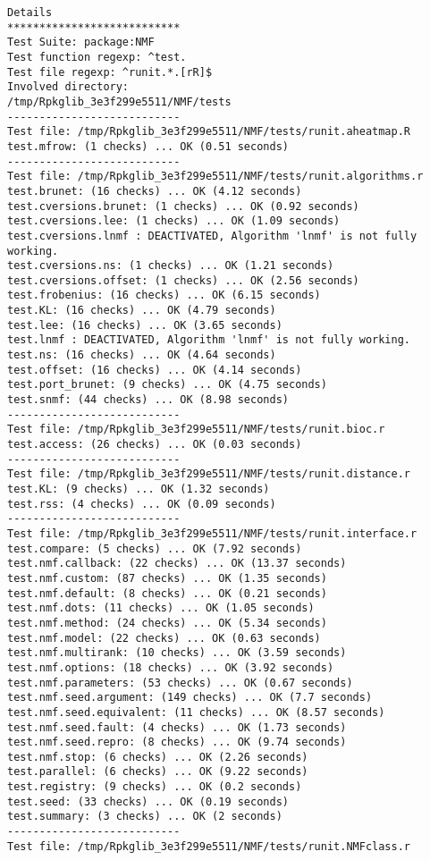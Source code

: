 \documentclass[10pt]{article}\usepackage{graphicx, color}
\begin{document}
\begin{verbatim}
Details 
*************************** 
Test Suite: package:NMF 
Test function regexp: ^test. 
Test file regexp: ^runit.*.[rR]$ 
Involved directory: 
/tmp/Rpkglib_3e3f299e5511/NMF/tests 
--------------------------- 
Test file: /tmp/Rpkglib_3e3f299e5511/NMF/tests/runit.aheatmap.R 
test.mfrow: (1 checks) ... OK (0.51 seconds)
--------------------------- 
Test file: /tmp/Rpkglib_3e3f299e5511/NMF/tests/runit.algorithms.r 
test.brunet: (16 checks) ... OK (4.12 seconds)
test.cversions.brunet: (1 checks) ... OK (0.92 seconds)
test.cversions.lee: (1 checks) ... OK (1.09 seconds)
test.cversions.lnmf : DEACTIVATED, Algorithm 'lnmf' is not fully working.
test.cversions.ns: (1 checks) ... OK (1.21 seconds)
test.cversions.offset: (1 checks) ... OK (2.56 seconds)
test.frobenius: (16 checks) ... OK (6.15 seconds)
test.KL: (16 checks) ... OK (4.79 seconds)
test.lee: (16 checks) ... OK (3.65 seconds)
test.lnmf : DEACTIVATED, Algorithm 'lnmf' is not fully working.
test.ns: (16 checks) ... OK (4.64 seconds)
test.offset: (16 checks) ... OK (4.14 seconds)
test.port_brunet: (9 checks) ... OK (4.75 seconds)
test.snmf: (44 checks) ... OK (8.98 seconds)
--------------------------- 
Test file: /tmp/Rpkglib_3e3f299e5511/NMF/tests/runit.bioc.r 
test.access: (26 checks) ... OK (0.03 seconds)
--------------------------- 
Test file: /tmp/Rpkglib_3e3f299e5511/NMF/tests/runit.distance.r 
test.KL: (9 checks) ... OK (1.32 seconds)
test.rss: (4 checks) ... OK (0.09 seconds)
--------------------------- 
Test file: /tmp/Rpkglib_3e3f299e5511/NMF/tests/runit.interface.r 
test.compare: (5 checks) ... OK (7.92 seconds)
test.nmf.callback: (22 checks) ... OK (13.37 seconds)
test.nmf.custom: (87 checks) ... OK (1.35 seconds)
test.nmf.default: (8 checks) ... OK (0.21 seconds)
test.nmf.dots: (11 checks) ... OK (1.05 seconds)
test.nmf.method: (24 checks) ... OK (5.34 seconds)
test.nmf.model: (22 checks) ... OK (0.63 seconds)
test.nmf.multirank: (10 checks) ... OK (3.59 seconds)
test.nmf.options: (18 checks) ... OK (3.92 seconds)
test.nmf.parameters: (53 checks) ... OK (0.67 seconds)
test.nmf.seed.argument: (149 checks) ... OK (7.7 seconds)
test.nmf.seed.equivalent: (11 checks) ... OK (8.57 seconds)
test.nmf.seed.fault: (4 checks) ... OK (1.73 seconds)
test.nmf.seed.repro: (8 checks) ... OK (9.74 seconds)
test.nmf.stop: (6 checks) ... OK (2.26 seconds)
test.parallel: (6 checks) ... OK (9.22 seconds)
test.registry: (9 checks) ... OK (0.2 seconds)
test.seed: (33 checks) ... OK (0.19 seconds)
test.summary: (3 checks) ... OK (2 seconds)
--------------------------- 
Test file: /tmp/Rpkglib_3e3f299e5511/NMF/tests/runit.NMFclass.r 

\end{verbatim}
\end{document}
